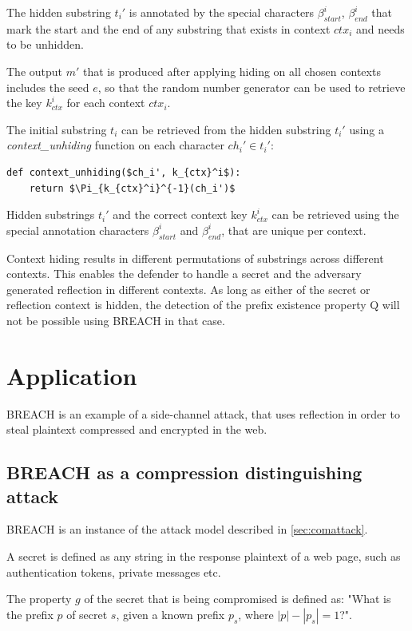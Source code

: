 \documentclass{sig-alternate-05-2015}
\begin{document}
The hidden substring $t_i'$ is annotated by the special characters
$\beta_{start}^i$, $\beta_{end}^i$ that mark the start and the end of any
substring that exists in context $ctx_i$ and needs to be unhidden.

The output $m'$ that is produced after applying hiding on all chosen contexts
includes the seed $e$, so that the random number generator can be used to
retrieve the key $k_{ctx}^i$ for each context $ctx_i$.

The initial substring $t_i$ can be retrieved from the hidden substring $t_i'$
using a \textit{context\_unhiding} function on each character $ch_i' \in t_i'$:

\begin{lstlisting}[texcl,mathescape]
def context_unhiding($ch_i', k_{ctx}^i$):
    return $\Pi_{k_{ctx}^i}^{-1}(ch_i')$
\end{lstlisting}

Hidden substrings $t_i'$ and the correct context key $k_{ctx}^i$ can be retrieved
using the special annotation characters $\beta_{start}^i$ and $\beta_{end}^i$,
that are unique per context.

Context hiding results in different permutations of substrings across different
contexts. This enables the defender to handle a secret and the adversary
generated reflection in different contexts. As long as either of the secret or
reflection context is hidden, the detection of the prefix existence property Q
will not be possible using BREACH in that case.

\section{Application}\label{sec:application}

BREACH is an example of a side-channel attack, that uses reflection in
order to steal plaintext compressed and encrypted in the web.

\subsection{BREACH as a compression distinguishing
attack}\label{subsec:breachapp}
BREACH is an instance of the attack model described in \ref{sec:comattack}.

A secret is defined as any string in the response plaintext of a web page, such
as authentication tokens, private messages etc.

The property $g$ of the secret that is being compromised is defined as: "What is
the prefix $p$ of secret $s$, given a known prefix $p_s$, where $|p| - |p_s| =
1$?".
\end{document}

